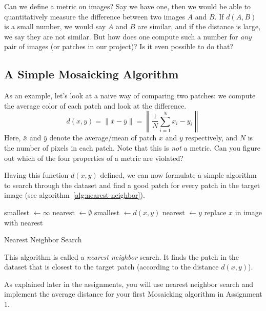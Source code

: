 \documentclass[]{article}
\begin{document}
		Can we define a metric on images? 
		Say we have one, then we would be able to quantitatively measure the difference between two images $A$ and $B$. 
		If $d(A, B)$ is a small number, we would say $A$ and $B$ are similar, and if the distance is large, we say they are not similar.
		But how does one compute such a number for \emph{any} pair of images (or patches in our project)?
		Is it even possible to do that?
		
	\subsection{A Simple Mosaicking Algorithm}\label{sec:simple-mosaicking}
		As an example, let's look at a naive way of comparing two patches: we compute the average color of each patch and look at the difference.
		\begin{equation}\label{eq:mean-color-distance}
			d(x, y) = \lVert \bar{x} - \bar{y} \rVert = \left\lVert \frac{1}{N} \sum_{i=1}^{N} x_i - y_i  \right\rVert
		\end{equation}
		Here, $\bar{x}$ and $\bar{y}$ denote the average/mean of patch $x$ and $y$ respectively, and $N$ is the number of pixels in each patch.
		Note that this is \emph{not} a metric. 
		Can you figure out which of the four properties of a metric are violated?
		
		Having this function $d(x, y)$ defined, we can now formulate a simple algorithm to search through the dataset and find a good patch for every patch in the target image (see algorithm~\ref{alg:nearest-neighbor}). 
		\begin{algorithm}[bt]
			\begin{algorithmic} 
					\STATE smallest $\leftarrow \infty$
					\STATE nearest $\leftarrow \emptyset$
						\STATE smallest $\leftarrow d(x, y)$
						\STATE nearest $\leftarrow y$
						\ENDIF
					\ENDFOR
					\STATE replace $x$ in image with nearest
				\ENDFOR
			\end{algorithmic}
			\caption{Nearest Neighbor Search}
			\label{alg:nearest-neighbor}
		\end{algorithm}
		This algorithm is called a \emph{nearest neighbor} search. 
		It finds the patch in the dataset that is closest to the target patch (according to the distance $d(x,y)$).
		
		As explained later in the assignments, you will use nearest neighbor search and implement the average distance for your first Mosaicking algorithm in Assignment 1.
		
\end{document}

